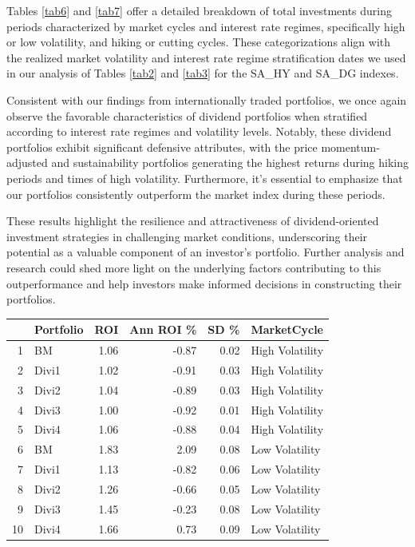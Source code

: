 \documentclass[11pt,preprint, authoryear]{elsarticle}
\let\origtable\table
\let\endorigtable\endtable
\renewenvironment{table}[1][2] {
    \expandafter\origtable\expandafter[H]
} {
    \endorigtable
}
\numberwithin{equation}{section}
\numberwithin{figure}{section}
\numberwithin{table}{section}
\begin{document}
Tables \ref{tab6} and \ref{tab7} offer a detailed breakdown of total
investments during periods characterized by market cycles and interest
rate regimes, specifically high or low volatility, and hiking or cutting
cycles. These categorizations align with the realized market volatility
and interest rate regime stratification dates we used in our analysis of
Tables \ref{tab2} and \ref{tab3} for the SA\_HY and SA\_DG indexes.

Consistent with our findings from internationally traded portfolios, we
once again observe the favorable characteristics of dividend portfolios
when stratified according to interest rate regimes and volatility
levels. Notably, these dividend portfolios exhibit significant defensive
attributes, with the price momentum-adjusted and sustainability
portfolios generating the highest returns during hiking periods and
times of high volatility. Furthermore, it's essential to emphasize that
our portfolios consistently outperform the market index during these
periods.

These results highlight the resilience and attractiveness of
dividend-oriented investment strategies in challenging market
conditions, underscoring their potential as a valuable component of an
investor's portfolio. Further analysis and research could shed more
light on the underlying factors contributing to this outperformance and
help investors make informed decisions in constructing their portfolios.

\begin{table}[H]
\centering
\begin{tabular}{rlrrrl}
  \hline
 & Portfolio & ROI & Ann ROI \% & SD \% & MarketCycle \\ 
  \hline
1 & BM & 1.06 & -0.87 & 0.02 & High Volatility  \\ 
  2 & Divi1 & 1.02 & -0.91 & 0.03 & High Volatility  \\ 
  3 & Divi2 & 1.04 & -0.89 & 0.03 & High Volatility  \\ 
  4 & Divi3 & 1.00 & -0.92 & 0.01 & High Volatility  \\ 
  5 & Divi4 & 1.06 & -0.88 & 0.04 & High Volatility  \\ 
  6 & BM & 1.83 & 2.09 & 0.08 & Low Volatility  \\ 
  7 & Divi1 & 1.13 & -0.82 & 0.06 & Low Volatility  \\ 
  8 & Divi2 & 1.26 & -0.66 & 0.05 & Low Volatility  \\ 
  9 & Divi3 & 1.45 & -0.23 & 0.08 & Low Volatility  \\ 
  10 & Divi4 & 1.66 & 0.73 & 0.09 & Low Volatility  \\ 
   \hline
\end{tabular}
\caption{Market Cycle Perforomance \label{tab6} } 
\end{table}
\end{document}
